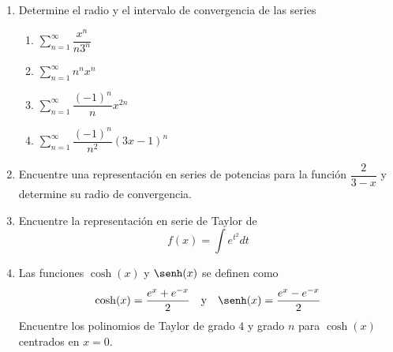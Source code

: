 \begin{frame}
  \begin{enumerate}
    \item Determine el radio y el intervalo de convergencia de las series
        \begin{enumerate}
          \item $\displaystyle\sum_{n=1}^\infty\dfrac{x^n}{n3^n}$
          \item $\displaystyle\sum_{n=1}^\infty n^n x^n$
          \item $\displaystyle\sum_{n=1}^\infty\dfrac{(-1)^n}{n}x^{2n}$
          \item $\displaystyle\sum_{n=1}^\infty\dfrac{(-1)^n}{n^2}(3x-1)^{n}$
        \end{enumerate}
  \end{enumerate}
\end{frame}


\begin{frame}
  \begin{enumerate}
    \setcounter{enumi}{1}
    \item Encuentre una representación en series de potencias para la función $\dfrac{2}{3-x}$ y determine su radio de convergencia.\\[0.5cm]
    \item Encuentre la representación en serie de Taylor de
    $$f(x)=\int e^{t^2}dt$$
    \item Las funciones $\cosh(x)$ y $\senh(x)$ se definen como
    $$\cosh(x)=\dfrac{e^x+e^{-x}}{2}\quad\text{y}\quad\senh(x)=\dfrac{e^x-e^{-x}}{2}$$
    Encuentre los polinomios de Taylor de grado $4$ y grado $n$ para $\cosh(x)$ centrados en $x=0$.
  \end{enumerate}
\end{frame}






